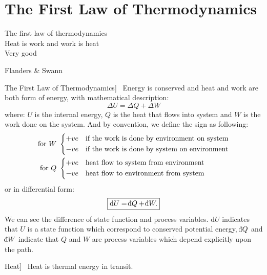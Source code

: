 \documentclass[UTF8]{book}
\def\dbar{{\mathchar'26\mkern-12mu \mathrm{d}}}		%
\newenvironment{theorem}[2][Theorem]{\begin{trivlist}
\item[\hskip \labelsep {\bfseries #1}\hskip \labelsep {\bfseries }]}{\end{trivlist}}
\begin{document}
\section{The First Law of Thermodynamics}
\epigraph{The first law of thermodynamics\\
Heat is work and work is heat \\
Very good}{Flanders \& Swann}

\begin{theorem}
[The First Law of Thermodynamics]~  {Energy is conserved and heat and work are both form of energy, with mathematical description:}
$$\boxed{\Delta U=\Delta Q+\Delta W}$$
where: $U$ is the internal energy, $Q$ is the heat that flows into system and $W$ is the work done on the system.
{And by convention, we define the sign as following:}
\begin{align*}
 \textrm{for }W\ &
   \begin{dcases}
     +ve \quad  \textrm{if the work is done by environment on system}\\
     -ve \quad  \textrm{if the work is done by system on environment}
   \end{dcases}\\
 \textrm{for }Q\ &
   \begin{dcases}
     +ve \quad  \textrm{heat flow to system from environment}\\
     -ve \quad  \textrm{heat flow to environment from system}
   \end{dcases}
\end{align*}
{or in differential form:}
$$\boxed{\mathrm{d} U=\dbar Q+\dbar W.}$$
We can see the difference of state function and process variables. $\mathrm{d}U$ indicates that $U$ is a state function which correspond to conserved potential energy, $\dbar Q$ and $\dbar W$ indicate that $Q$ and $W$ are process variables which depend explicitly upon the path.
\end{theorem}

\begin{theorem}
[Heat]~  {Heat is thermal energy in transit.}
\end{theorem}
\end{document}

